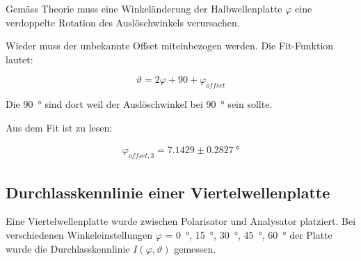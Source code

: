 Gem\"ass Theorie muss eine Winkel\"anderung der  Halbwellenplatte $\varphi$ eine
verdoppelte Rotation des Ausl\"oschwinkels verursachen.

Wieder muss der unbekannte Offset miteinbezogen werden. Die Fit-Funktion lautet:

\begin{equation}
    \vartheta = 2\varphi + 90 + \varphi_{offset}
\end{equation}

Die  \SI{90}{\degree}  sind dort weil der Ausl\"oschwinkel bei  \SI{90}{\degree}
sein sollte.

Aus dem Fit ist zu lesen:

\begin{align*}
    \varphi_{offset,3} = 7.1429 \pm 0.2827\SI{}{\degree}
\end{align*}


\subsection{Durchlasskennlinie einer Viertelwellenplatte}

Eine Viertelwellenplatte wurde  zwischen  Polarisator  und Analysator platziert.
Bei    verschiedenen    Winkeleinstellungen   $\varphi$    =    \SI{0}{\degree},
\SI{15}{\degree},  \SI{30}{\degree},  \SI{45}{\degree},   \SI{60}{\degree}   der
Platte   wurde   die   Durchlasskennlinie  $I(\varphi,   \vartheta)$   gemessen.

